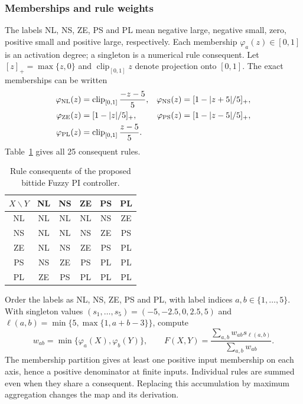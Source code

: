\subsubsection{Memberships and rule weights}
The labels NL, NS, ZE, PS and PL mean negative large, negative small, zero, positive small and positive large, respectively. Each membership $\varphi_a(z)\in[0,1]$ is an activation degree; a singleton is a numerical rule consequent. Let $[z]_+=\max\{z,0\}$ and $\operatorname{clip}_{[0,1]}z$
denote projection onto $[0,1]$. The exact memberships can be written
\begin{align}
 \varphi_{\rm NL}(z)&=\operatorname{clip}_{[0,1]}\frac{-z-5}{5},&
 \varphi_{\rm NS}(z)&=[1-|z+5|/5]_+,\nonumber\\
 \varphi_{\rm ZE}(z)&=[1-|z|/5]_+,&
 \varphi_{\rm PS}(z)&=[1-|z-5|/5]_+,\nonumber\\
 \varphi_{\rm PL}(z)&=\operatorname{clip}_{[0,1]}\frac{z-5}{5}.
 \label{eq:fpi_full_memberships}
\end{align}
Table~\ref{tab:fpi_full_rules} gives all 25 consequent rules.
\begin{table}[t]
\caption{Rule consequents of the proposed bittide Fuzzy PI controller.}
\label{tab:fpi_full_rules}
\centering
\begin{tabular}{@{}c|ccccc@{}}
\toprule
$X\backslash Y$ & NL & NS & ZE & PS & PL\\
\midrule
NL & NL & NL & NL & NS & ZE\\
NS & NL & NL & NS & ZE & PS\\
ZE & NL & NS & ZE & PS & PL\\
PS & NS & ZE & PS & PL & PL\\
PL & ZE & PS & PL & PL & PL\\
\bottomrule
\end{tabular}
\end{table}
Order the labels as NL, NS, ZE, PS and PL, with label indices
$a,b\in\{1,\ldots,5\}$. With singleton values
$(s_1,\ldots,s_5)=(-5,-2.5,0,2.5,5)$ and
$\ell(a,b)=\min\{5,\max\{1,a+b-3\}\}$, compute
\begin{equation}
 w_{ab}=\min\{\varphi_a(X),\varphi_b(Y)\},\qquad
 F(X,Y)=\frac{\sum_{a,b}w_{ab}s_{\ell(a,b)}}{\sum_{a,b}w_{ab}}.
 \label{eq:fpi_rules}
\end{equation}
The membership partition gives at least one positive input membership on
each axis, hence a positive denominator at finite inputs. Individual rules
are summed even when they share a consequent. Replacing this accumulation
by maximum aggregation changes the map and its derivation.

